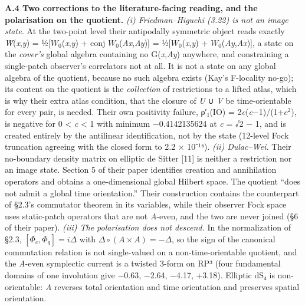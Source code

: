\documentclass[
]{article}
\begin{document}
\textbf{A.4 Two corrections to the literature-facing reading, and the
polarisation on the quotient.} \emph{(i) Friedman--Higuchi (3.22) is not
an image state.} At the two-point level their antipodally symmetric
object reads exactly \emph{W̃}(\emph{x},\emph{y}) =
½{[}\(W_0\)(\emph{x},\emph{y}) + conj \(W_0\)(\emph{Ax},\emph{Ay}){]} =
½{[}\(W_0\)(\emph{x},\emph{y}) + \(W_0\)(\emph{Ay},\emph{Ax}){]}, a
state on the \emph{cover's} global algebra containing no
G(\emph{x},\emph{Ay}) anywhere, and constraining a single-patch
observer's correlators not at all. It is not a state on any global
algebra of the quotient, because no such algebra exists (Kay's
F-locality no-go); its content on the quotient is the \emph{collection}
of restrictions to a lifted atlas, which is why their extra atlas
condition, that the closure of \emph{U} ∪ \emph{V} be time-orientable
for every pair, is needed. Their own positivity failure, ρ′₁(IO) =
2\emph{c}(\emph{c}−1)/(1+\(c^2\)), is negative for 0 \textless{}
\emph{c} \textless{} 1 with minimum −0.4142135624 at \emph{c} = √2 − 1,
and is created entirely by the antilinear identification, not by the
state (12-level Fock truncation agreeing with the closed form to 2.2 ×
10⁻¹⁶). \emph{(ii) Dulac--Wei.} Their no-boundary density matrix on
elliptic de Sitter {[}11{]} is neither a restriction nor an image state.
Section 5 of their paper identifies creation and annihilation operators
and obtains a one-dimensional global Hilbert space. The quotient ``does
not admit a global time orientation.'' Their construction contains the
counterpart of §2.3's commutator theorem in its variables, while their
observer Fock space uses static-patch operators that are not
\emph{A}-even, and the two are never joined (§6 of their paper).
\emph{(iii) The polarisation does not descend.} In the normalization of
§2.3, \([\Phi_c,\Phi_q]=i\Delta\) with
\(\Delta\circ(A\times A)=-\Delta\), so the sign of the canonical
commutation relation is not single-valued on a non-time-orientable
quotient, and the \emph{A}-even symplectic current is a twisted 3-form
on RP³ (four fundamental domains of one involution give −0.63, −2.64,
−4.17, +3.18). Elliptic dS₄ is non-orientable: \emph{A} reverses total
orientation and time orientation and preserves spatial orientation.
\end{document}

